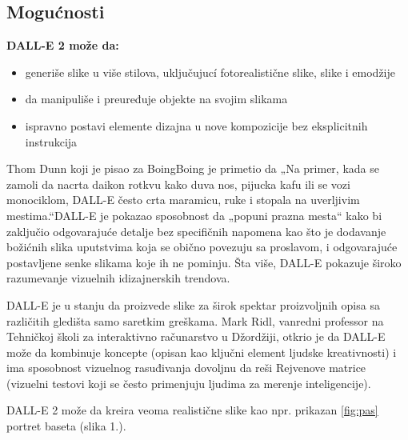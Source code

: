 \documentclass[a4paper]{article}
\begin{document}
\subsection{Mogućnosti}
\label{subsec:mogućnosti}

\textbf{DALL-E 2 može da:}
\begin{itemize}
\item generiše slike u više stilova, uključujucí fotorealistične slike, slike i emodžije
\item da manipuliše i preuređuje objekte na svojim slikama
\item ispravno postavi elemente dizajna u nove kompozicije bez eksplicitnih instrukcija
\end{itemize} 

Thom Dunn koji je pisao za BoingBoing je primetio da „Na primer, kada se zamoli da nacrta daikon rotkvu kako duva nos, pijucka kafu ili se vozi monociklom, DALL-E često crta maramicu, ruke i stopala na uverljivim mestima.“DALL-E je pokazao sposobnost da „popuni prazna mesta“ kako bi zaključio odgovarajuće detalje bez specifičnih napomena kao što je dodavanje božićnih slika uputstvima koja se obično povezuju sa proslavom, i odgovarajuće postavljene senke slikama koje ih ne pominju. Šta više, DALL-E pokazuje široko razumevanje vizuelnih idizajnerskih trendova.

DALL-E je u stanju da proizvede slike za širok spektar proizvoljnih opisa sa različitih gledišta samo saretkim greškama. Mark Ridl, vanredni professor na Tehničkoj školi za interaktivno računarstvo u Džordžiji, otkrio je da DALL-E može da kombinuje koncepte (opisan kao ključni element ljudske kreativnosti) i ima sposobnost vizuelnog rasuđivanja dovoljnu da reši Rejvenove matrice (vizuelni testovi koji se često primenjuju ljudima za merenje inteligencije).

DALL-E 2 može da kreira veoma realistične slike kao npr. prikazan \ref{fig:pas} portret baseta (slika 1.).
\end{document}
